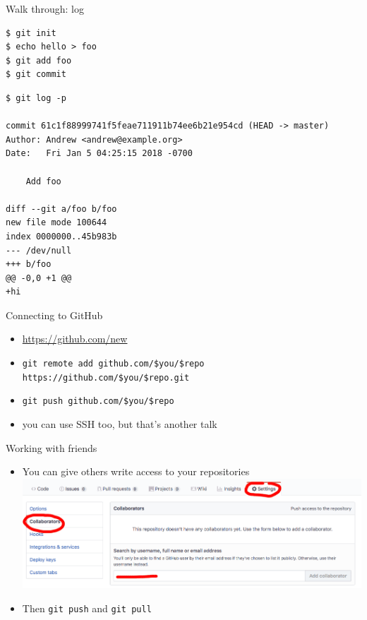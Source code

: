 \documentclass[xcolor=svgnames,17pt]{beamer}
\newcommand*{\sizefont}[1]{%
    \ifcase#1\relax
    \or \tiny
    \or \scriptsize
    \or \footnotesize
    \or \small
    \or \normalsize
    \or \large
    \or \Large
    \or \LARGE
    \or \huge
    \or \Huge
    \fi}
\begin{document}
\begin{frame}[fragile]{Walk through: log}
\sizefont{2}
\begin{verbatim}
$ git init
$ echo hello > foo
$ git add foo
$ git commit
\end{verbatim}
\pause
\begin{verbatim}
$ git log -p

commit 61c1f88999741f5feae711911b74ee6b21e954cd (HEAD -> master)
Author: Andrew <andrew@example.org>
Date:   Fri Jan 5 04:25:15 2018 -0700

    Add foo

diff --git a/foo b/foo
new file mode 100644
index 0000000..45b983b
--- /dev/null
+++ b/foo
@@ -0,0 +1 @@
+hi
\end{verbatim}
\end{frame}

\begin{frame}{Connecting to GitHub}
\begin{itemize}
\item \href{https://github.com/new}{https://github.com/new}
\pause
\item \texttt{git remote add github.com/\$you/\$repo
https://github.com/\$you/\$repo.git}
\pause
\item \texttt{git push github.com/\$you/\$repo}
\pause
\item \sizefont{2} you can use SSH too, but that’s another talk
\end{itemize}
\end{frame}

\begin{frame}{Working with friends}
\begin{itemize}
\item You can give others write access to your repositories \\
\includegraphics[width=\paperwidth,center]{github-add-collaborator.png}
\item Then \texttt{git push} and \texttt{git pull}
\end{itemize}
\end{frame}
\end{document}
